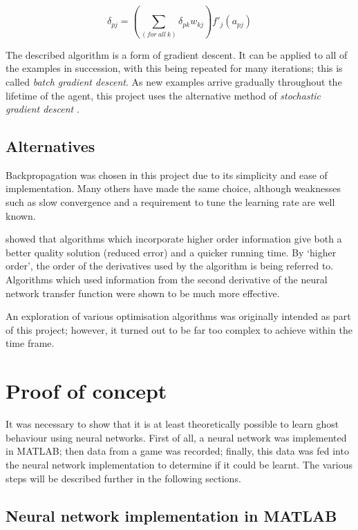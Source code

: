 \begin{equation}
\delta_{pj} = \left(\sum_{(for~all~k)}\delta_{pk}w_{kj}\right)f'_{j}(a_{pj})
\label{eq:hiddenerror}
\end{equation}

The described algorithm is a form of gradient descent.  It can be applied to all of the examples in succession, with this being repeated for many iterations; this is called \emph{batch gradient descent}.  As new examples arrive gradually throughout the lifetime of the agent, this project uses the alternative method of \emph{stochastic gradient descent} \citep[p. 720]{RussellNorvig}.

\subsection{Alternatives}

Backpropagation was chosen in this project due to its simplicity and ease of implementation.  Many others have made the same choice, although weaknesses such as slow convergence and a requirement to tune the learning rate are well known.

\citet{Groot1994} showed that algorithms which incorporate higher order information give both a better quality solution (reduced error) and a quicker running time.  By `higher order', the order of the derivatives used by the algorithm is being referred to.  Algorithms which used information from the second derivative of the neural network transfer function were shown to be much more effective.

An exploration of various optimisation algorithms was originally intended as part of this project; however, it turned out to be far too complex to achieve within the time frame.

\section{Proof of concept}

It was necessary to show that it is at least theoretically possible to learn ghost behaviour using neural networks.  First of all, a neural network was implemented in MATLAB; then data from a game was recorded; finally, this data was fed into the neural network implementation to determine if it could be learnt.  The various steps will be described further in the following sections.

\subsection{Neural network implementation in MATLAB}
\label{sec:matlab}

